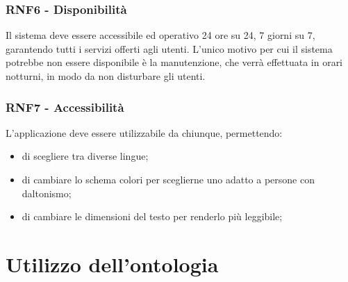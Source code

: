 \documentclass[12pt, a4paper]{article}
\begin{document}
\subsubsection*{\hypertarget{RNF6}{RNF6 - Disponibilità}}

Il sistema deve essere accessibile ed operativo 24 ore su 24, 7 giorni su 7, garantendo tutti i servizi offerti agli utenti.
L'unico motivo per cui il sistema potrebbe non essere disponibile è la manutenzione, che verrà effettuata in orari notturni, in modo da non disturbare gli utenti.

\subsubsection*{\hypertarget{RNF7}{RNF7 - Accessibilità}}

L'applicazione deve essere utilizzabile da chiunque, permettendo:
\begin{itemize}
    \item di scegliere tra diverse lingue;
    \item di cambiare lo schema colori per sceglierne uno adatto a persone con daltonismo;
    \item di cambiare le dimensioni del testo per renderlo più leggibile;
\end{itemize}

\section{Utilizzo dell'ontologia}
\end{document}
